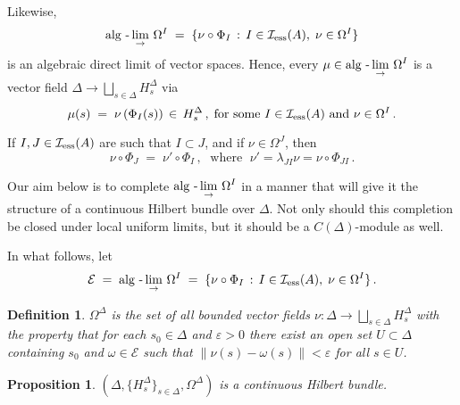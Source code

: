 \documentclass{amsart}
\newtheorem{proposition}[theorem]{Proposition}
\newtheorem{definition}[theorem]{Definition}
\theoremstyle{definition}
\theoremstyle{remark}
\begin{document}
Likewise,
\begin{equation}\label{algebraic omega}
\displaystyle\mbox{\rm alg -}\lim_{\rightarrow}\,\Omega^I\;=\;\{\nu\circ\Phi_I\,:\,I\in  \mathcal I_{\rm ess}(A),\;\nu\in\Omega^I\}
\end{equation}
is an algebraic direct limit of vector spaces. Hence, every $\mu\in \displaystyle\mbox{\rm alg -}\lim_{\rightarrow}\,\Omega^I$ is a vector field $\Delta\rightarrow\bigsqcup_{s\in\Delta}H_s^\Delta$
via
\[
\mu(s)\;=\;\nu\left(\Phi_I(s)\right) \,\in\, H_s^\Delta\,,\;\mbox{for some }I\in \mathcal I_{\rm ess}(A)\mbox{ and } \nu\in\Omega^I\,.
\]

 If $I,J\in \mathcal I_{\rm ess}(A)$  are such that $I\subset J$, and if $\nu\in\Omega^J$,
then
\begin{equation}\label{notation1}
\nu\circ\Phi_J\;=\;\nu'\circ\Phi_I\,,\;\mbox{ where }\;\nu'=\lambda_{JI}\nu=\nu\circ\Phi_{JI}\,.
\end{equation}

Our aim below is to complete $\displaystyle\mbox{\rm alg -}\lim_{\rightarrow}\,\Omega^I$ in a manner that will give it the
structure of a continuous Hilbert bundle over $\Delta$. Not only should this completion be closed under local uniform limits, but it should be
a $C(\Delta)$-module as well.

In what follows, let
\begin{equation}\label{algebraic omega E}
\mathcal E\;=\;\displaystyle\mbox{\rm alg -}\lim_{\rightarrow}\,\Omega^I\;=\;\{\nu\circ\Phi_I\,:\,I\in  \mathcal I_{\rm ess}(A),\;\nu\in\Omega^I\}\,.
\end{equation}

\begin{definition} $\Omega^\Delta$ is the set of all bounded vector fields
$\nu:\Delta\rightarrow\bigsqcup_{s\in\Delta}H^\Delta_s$ with the property that for
each $s_0\in \Delta$ and $\varepsilon >0$ there exist an open set $U\subset\Delta$
containing $s_0$ and $\omega\in\mathcal E$ such that $\|\nu(s)-\omega(s)\|<\varepsilon$
for all $s\in U$.
\end{definition}

\begin{proposition} $(\Delta, \{H_s^\Delta\}_{s\in\Delta}, \Omega^\Delta)$ is a continuous Hilbert bundle.
\end{proposition}
\end{document}
